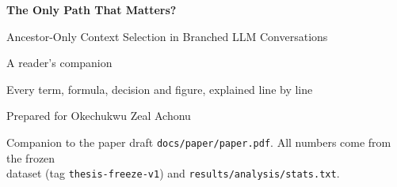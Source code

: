 \documentclass[11pt,letterpaper,oneside]{report}
\begin{document}
\begin{titlepage}
\centering
\vspace*{1.6in}
{\Huge\bfseries The Only Path That Matters?\par}
\vspace{10pt}
{\Large Ancestor-Only Context Selection in Branched LLM Conversations\par}
\vspace{28pt}
{\LARGE A reader's companion\par}
\vspace{10pt}
{\large Every term, formula, decision and figure, explained line by line\par}
\vspace{48pt}
{\large Prepared for Okechukwu Zeal Achonu\par}
\vfill
{\small Companion to the paper draft \texttt{docs/paper/paper.pdf}. All numbers come from the frozen\\ dataset (tag \texttt{thesis-freeze-v1}) and \texttt{results/analysis/stats.txt}.\par}
\end{titlepage}

\tableofcontents
\clearpage














\appendix


\end{document}
